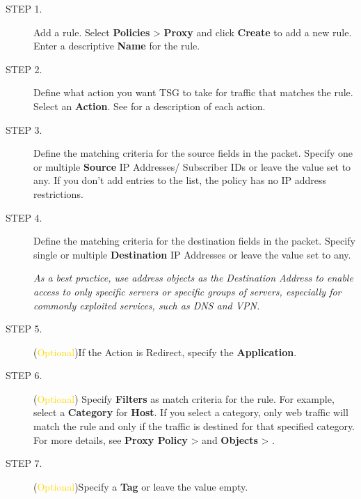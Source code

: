 \begin{description}
    \item[STEP 1.]	Add a rule. Select \textbf{Policies} > \textbf{Proxy} and click \textbf{Create} to add a new rule. Enter a descriptive \textbf{Name} for the rule.
    \item[STEP 2.]	Define what action you want TSG to take for traffic that matches the rule. Select an \textbf{Action}. See \hyperlink{link:Proxy Actions}{\color{linkblue}{Proxy Policy Actions}} for a description of each action.
    \item[STEP 3.]	Define the matching criteria for the source fields in the packet. Specify one or multiple \textbf{Source} IP Addresses/ Subscriber IDs or leave the value set to any. If you don’t add entries to the list, the policy has no IP address restrictions.
    \item[STEP 4.]	Define the matching criteria for the destination fields in the packet. Specify single or multiple \textbf{Destination} IP Addresses or leave the value set to any.


    \notemark\textit{As a best practice, use address objects as the Destination Address to enable access to only specific servers or specific groups of servers, especially for commonly exploited services, such as DNS and VPN.}
    \item[STEP 5.]	(\textcolor{gold}{Optional})If the Action is Redirect, specify the \textbf{Application}.
    \item[STEP 6.]	(\textcolor{gold}{Optional}) Specify \textbf{Filters} as match criteria for the rule. For example, select a \textbf{Category} for \textbf{Host}. 
    If you select a category, only web traffic will match the rule and only if the traffic is destined for that specified category. 
    For more details, see \textbf{Proxy Policy} > \textbf{\hyperlink{link:Proxy Applications and Filters}{\color{linkblue}{Applications and Filters}}} and \textbf{Objects} > \textbf{\hyperlink{link:Applications}{\color{linkblue}{Applications}}}.
    \item[STEP 7.]	(\textcolor{gold}{Optional})Specify a \textbf{Tag} or leave the value empty.
    

\end{description}
